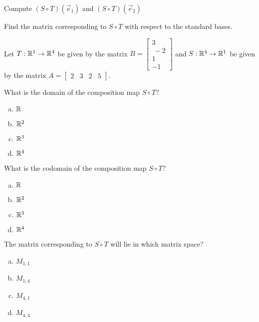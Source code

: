 \begin{applicationActivities}{1}{21}
\begin{activity}{0}
Compute $(S \circ T)(\vec{e}_1)$ and $(S \circ T)(\vec{e}_2)$
\end{activity}

\begin{activity}{0}
Find the matrix corresponding to $S \circ T$ with respect to the standard bases.
\end{activity}

\begin{activity}{0}
Let $T: \mathbb{R}^1 \rightarrow \mathbb{R}^4$ be given by the matrix $B=\begin{bmatrix} 3 \\\ -2 \\ 1 \\ -1\end{bmatrix}$ and $S: \mathbb{R}^4 \rightarrow \mathbb{R}^1$ be given by the matrix $A=\begin{bmatrix}2 & 3 & 2 & 5 \end{bmatrix}$.

What is the domain of the composition map $S \circ T$?
\begin{enumerate}[(a)]
\item $\mathbb{R}$
\item $\mathbb{R}^2$
\item $\mathbb{R}^3$
\item $\mathbb{R}^4$
\end{enumerate}
\end{activity}

\begin{activity}{0}
What is the codomain of the composition map $S \circ T$?
\begin{enumerate}[(a)]
\item $\mathbb{R}$
\item $\mathbb{R}^2$
\item $\mathbb{R}^3$
\item $\mathbb{R}^4$
\end{enumerate}
\end{activity}

\begin{activity}{0}
The matrix corresponding to $S \circ T$ will lie in which matrix space?
\begin{enumerate}[(a)]
\item $M_{1,1}$
\item $M_{1,4}$
\item $M_{4,1}$
\item $M_{4,4}$
\end{enumerate}
\end{activity}


\end{applicationActivities}
